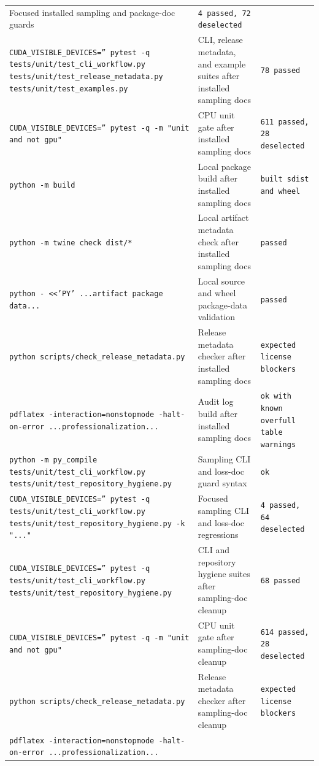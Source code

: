 \documentclass[11pt]{article}
\begin{document}
\begin{center}
\begin{tabular}{lll}
Focused installed sampling and package-doc guards &
\texttt{4 passed, 72 deselected} \\
\texttt{CUDA\_VISIBLE\_DEVICES='' pytest -q tests/unit/test\_cli\_workflow.py tests/unit/test\_release\_metadata.py tests/unit/test\_examples.py} &
CLI, release metadata, and example suites after installed sampling docs &
\texttt{78 passed} \\
\texttt{CUDA\_VISIBLE\_DEVICES='' pytest -q -m "unit and not gpu"} &
CPU unit gate after installed sampling docs &
\texttt{611 passed, 28 deselected} \\
\texttt{python -m build} &
Local package build after installed sampling docs &
\texttt{built sdist and wheel} \\
\texttt{python -m twine check dist/*} &
Local artifact metadata check after installed sampling docs &
\texttt{passed} \\
\texttt{python - <<'PY' ...artifact package data...} &
Local source and wheel package-data validation &
\texttt{passed} \\
\texttt{python scripts/check\_release\_metadata.py} &
Release metadata checker after installed sampling docs &
\texttt{expected license blockers} \\
\texttt{pdflatex -interaction=nonstopmode -halt-on-error ...professionalization...} &
Audit log build after installed sampling docs &
\texttt{ok with known overfull table warnings} \\
\texttt{python -m py\_compile tests/unit/test\_cli\_workflow.py tests/unit/test\_repository\_hygiene.py} &
Sampling CLI and loss-doc guard syntax &
\texttt{ok} \\
\texttt{CUDA\_VISIBLE\_DEVICES='' pytest -q tests/unit/test\_cli\_workflow.py tests/unit/test\_repository\_hygiene.py -k "..."} &
Focused sampling CLI and loss-doc regressions &
\texttt{4 passed, 64 deselected} \\
\texttt{CUDA\_VISIBLE\_DEVICES='' pytest -q tests/unit/test\_cli\_workflow.py tests/unit/test\_repository\_hygiene.py} &
CLI and repository hygiene suites after sampling-doc cleanup &
\texttt{68 passed} \\
\texttt{CUDA\_VISIBLE\_DEVICES='' pytest -q -m "unit and not gpu"} &
CPU unit gate after sampling-doc cleanup &
\texttt{614 passed, 28 deselected} \\
\texttt{python scripts/check\_release\_metadata.py} &
Release metadata checker after sampling-doc cleanup &
\texttt{expected license blockers} \\
\texttt{pdflatex -interaction=nonstopmode -halt-on-error ...professionalization...} &

\end{tabular}
\end{center}
\end{document}
